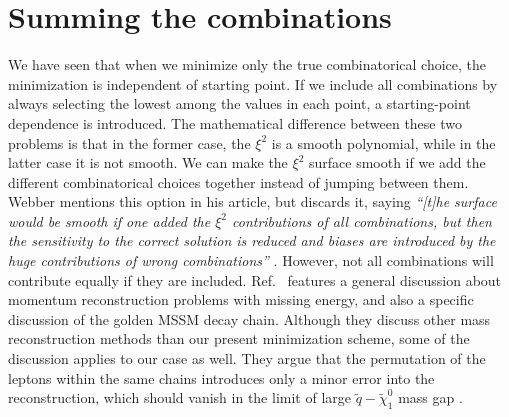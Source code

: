\documentclass[twoside,english]{uiofysmaster}
\begin{document}
\section{Summing the combinations}
\label{sec:combinatorics-sum_all_contributions}
We have seen that when we minimize only the true combinatorical choice, the minimization is independent of starting point. If we include all combinations by always selecting the lowest among the values in each point, a starting-point dependence is introduced. The mathematical difference between these two problems is that in the former case, the $\xi^2$ is a smooth polynomial, while in the latter case it is not smooth. We can make the $\xi^2$ surface smooth if we add the different combinatorical choices together instead of jumping between them. Webber mentions this option in his article, but discards it, saying {\it ``[t]he surface would be smooth if one added the $\xi^2$ contributions of all combinations,  but then the sensitivity to the correct solution is reduced and biases are introduced by the huge contributions of wrong combinations''} \cite[p.\ 6]{Webber:2009vm}. However, not all combinations will contribute equally if they are included. Ref.\ \cite{Gripaios:2011jm} features a general discussion about momentum reconstruction problems with missing energy, and also a specific discussion of the golden MSSM decay chain. Although they discuss other mass reconstruction methods than our present minimization scheme, some of the discussion applies to our case as well. They argue that the permutation of the leptons within the same chains introduces only a minor error into the reconstruction, which should vanish in the limit of large $\tilde q-\tilde \chi_1^0$ mass gap \cite[pp.\ 19--21]{Gripaios:2011jm}.
\end{document}

